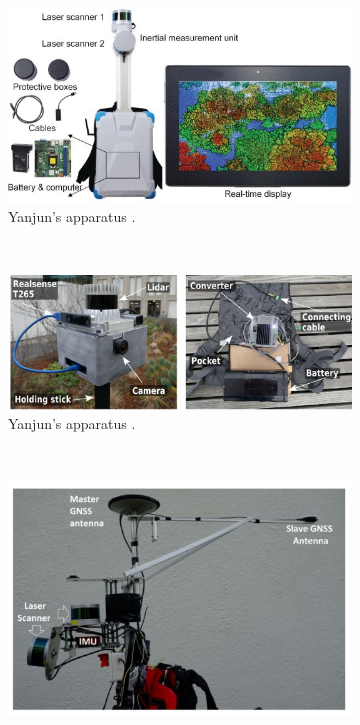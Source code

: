 \begin{figure}[H]
\begin{subfigure}{0.35\textwidth}
        \label{fig: Xiao apparatus}
    \end{subfigure}
    \\[3ex]
    \begin{subfigure}{0.6\textwidth}
        \includegraphics[width=\linewidth]{images/background/su_apparatus.jpg}
        \caption{Yanjun's apparatus \cite{su_development_2021}.}
        \label{fig: yanjun apparatus}
    \end{subfigure}
    \\[3ex]
    \begin{subfigure}{0.6\textwidth}
      \includegraphics[width=\linewidth]{images/background/jelavic_towards_sensor_module.png}
      \caption{Yanjun's apparatus \cite{su_development_2021}.}
      \label{fig: jelavic apparatus}
  \end{subfigure}
  \\[3ex]
    \begin{subfigure}{0.35\textwidth}
        \includegraphics[width=\linewidth]{images/background/oveland_apparatus.jpg}

\end{subfigure}
\end{figure}

